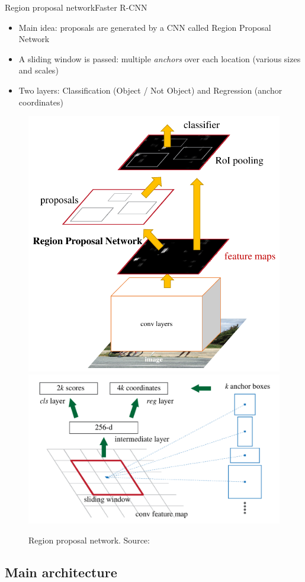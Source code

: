 \documentclass[9pt,t,aspectratio=1610]{beamer}
\newcommand{\ratio}{0.5}
\begin{document}
\begin{frame}{Region proposal network}{Faster R-CNN}
\begin{itemize}
    \item Main idea: proposals are generated by a CNN called Region Proposal Network
    \pause
    \item A sliding window is passed: multiple \emph{anchors} over each location (various sizes and scales)
    \item Two layers: Classification (Object / Not Object) and Regression (anchor coordinates)
\end{itemize}
    
\renewcommand{\ratio}{0.45}
\centering
\begin{figure}
    \includegraphics[width=0.4\linewidth]{faster_rnn_wholenetwork.png}
    \includegraphics[width=0.55\linewidth]{faster_rnn_rpn.png}
    \caption{Region proposal network. Source: \cite{ren2015faster}}
\end{figure}

\end{frame}

\subsection{Main architecture}

\begin{frame}[noframenumbering]{\ }
\hfill
\parbox[t]{.85\textwidth}{
  \begin{minipage}[c][0.65\textheight]{\textwidth}
  \tableofcontents[currentsection, subsectionstyle=show/shaded/shaded]
  \end{minipage}
}
\end{frame}
\end{document}
